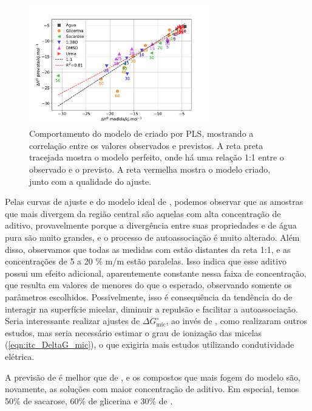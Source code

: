		\begin{figure}[h]
			\centering
			\includegraphics[width=0.7\textwidth]{imagens/itc/PLS_dh_pirouette}
			\caption{Comportamento do modelo de \DHmic{} criado por PLS, mostrando a correlação entre os valores observados e previstos. A reta preta tracejada mostra o modelo perfeito, onde há uma relação 1:1 entre o observado e o previsto. A reta vermelha mostra o modelo criado, junto com a qualidade do ajuste.}
			\label{fig:pls_dh_pirouette}
		\end{figure} 
		
		Pelas curvas de ajuste e do modelo ideal de \cmc, podemos observar que as amostras que mais divergem da região central são aquelas com alta concentração de aditivo, provavelmente porque a divergência entre suas propriedades e de água pura são muito grandes, e o processo de autoassociação é muito alterado. Além disso, observamos que todas as medidas com \BD{} estão distantes da reta 1:1, e as concentrações de 5 a 20 \% m/m estão paralelas. Isso indica que esse aditivo possui um efeito adicional, aparentemente constante nessa faixa de concentração, que resulta em valores de \cmc{} menores do que o esperado, observando somente os parâmetros escolhidos. Possivelmente, isso é consequência da tendência do \BD{} de interagir na superfície micelar, diminuir a repulsão e facilitar a autoassociação. Seria interessante realizar ajustes de \(\Delta G^\circ_\mathrm{mic}\), ao invés de \cmc, como realizaram outros estudos\cite{Abdel-Rahem2012, Moya2007a}, mas seria necessário estimar o grau de ionização das micelas (\autoref{eqn:itc_DeltaG_mic}), o que exigiria mais estudos utilizando condutividade elétrica.
		
		A previsão de \DHmic{} é melhor que de \cmc, e os compostos que mais fogem do modelo são, novamente, as soluções com maior concentração de aditivo. Em especial, temos 50\% de sacarose, 60\% de glicerina e 30\% de \BD{}.
		
